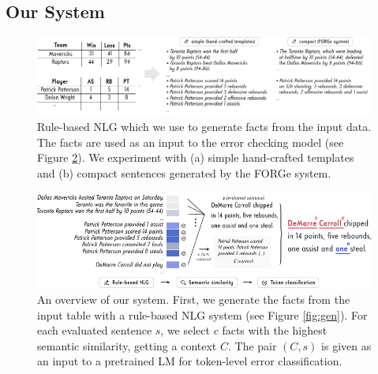 


\subsection{Our System}
\label{sec:tok-eval:system}

\begin{figure}[ht]
    \centering
    \includegraphics[width=\textwidth]{img/tok-eval_generator.pdf}
    \caption{Rule-based NLG which we use to generate facts from the input data. The facts are used as an input to the error checking model (see Figure \ref{fig:tok-eval:system}). We experiment with (a) simple hand-crafted templates and (b) compact sentences generated by the FORGe system.}
    \label{fig:tok-eval:gen}
\end{figure}


\begin{figure}[ht]
    \centering
    \includegraphics[width=\textwidth]{img/tok-eval_system.pdf}
    \caption{An overview of our system. First, we generate the facts from the input table with a rule-based NLG system (see Figure \ref{fig:gen}). For each evaluated sentence $s$, we select $c$ facts with the highest semantic similarity, getting a context $C$. The pair $(C, s)$ is given as an input to a pretrained LM for token-level error classification.}
    \label{fig:tok-eval:system}
\end{figure}


